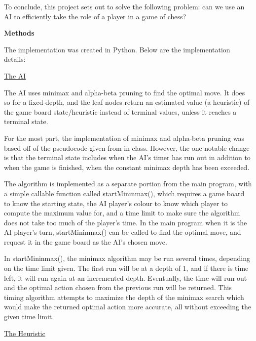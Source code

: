 \documentclass[12pt, letterpaper]{article}
\begin{document}
\medskip

To conclude, this project sets out to solve the following problem: can we use an AI to
efficiently take the role of a player in a game of chess?

\bigskip

\textbf{Methods}

The implementation was created in Python. Below are the implementation details:

\medskip

\underline{The AI}

\medskip

The AI uses minimax and alpha-beta pruning to find the optimal move. It does so for a fixed-depth,
and the leaf nodes return an estimated value (a heuristic) of the game board state/heuristic instead
of terminal values, unless it reaches a terminal state.

\medskip

For the most part, the implementation of minimax and alpha-beta pruning was based off of the pseudocode
given from in-class. However, the one notable change is that the terminal state includes when the
AI's timer has run out in addition to when the game is finished, when the constant minimax depth has been exceeded.

\medskip

The algorithm is implemented as a separate portion from the main program, with a simple callable function
called startMininmax(), which requires a game board to know the starting state, the AI player's colour to know
which player to compute the maximum value for, and a time limit to make sure the algorithm does not take too much
of the player's time. In the main program when it is the AI player's turn, startMininmax() can be called to
find the optimal move, and request it in the game board as the AI's chosen move.

\medskip

In startMininmax(), the minimax algorithm may be run several times, depending on the time limit given.
The first run will be at a depth of 1, and if there is time left, it will run again at an incremented depth.
Eventually, the time will run out and the optimal action chosen from the previous run will be returned.
This timing algorithm attempts to maximize the depth of the minimax search which would make the returned
optimal action more accurate, all without exceeding the given time limit.

\clearpage

\underline{The Heuristic}
\end{document}
